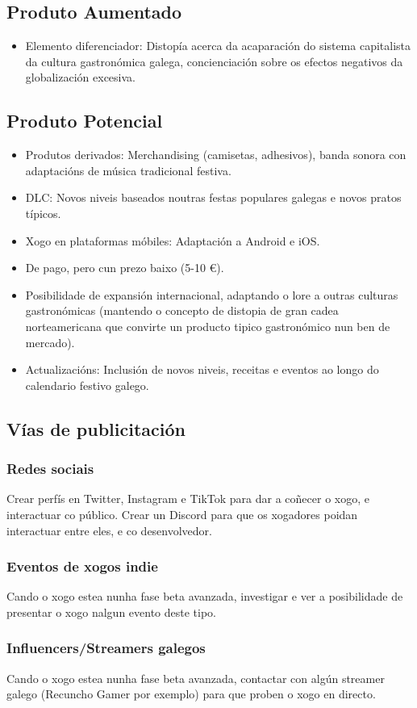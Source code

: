 \documentclass{report}  %
\begin{document}
\subsection{Produto Aumentado}
\begin{itemize}
    \item Elemento diferenciador: Distopía acerca da acaparación do sistema capitalista da cultura gastronómica galega, concienciación sobre os efectos negativos da globalización excesiva.
\end{itemize}

\subsection{Produto Potencial}
\begin{itemize}
    \item Produtos derivados: Merchandising (camisetas, adhesivos), banda sonora con adaptacións de música tradicional festiva.
    \item DLC: Novos niveis baseados noutras festas populares galegas e novos pratos típicos.
    \item Xogo en plataformas móbiles: Adaptación a Android e iOS.
    \item De pago, pero cun prezo baixo (5-10 €).
    \item Posibilidade de expansión internacional, adaptando o lore a outras culturas gastronómicas (mantendo o concepto de distopia de gran cadea norteamericana que convirte un producto tipico gastronómico nun ben de mercado).
    \item Actualizacións: Inclusión de novos niveis, receitas e eventos ao longo do calendario festivo galego.
\end{itemize}


\subsection{Vías de publicitación}
\subsubsection{Redes sociais}
Crear perfís en Twitter, Instagram e TikTok para dar a coñecer o xogo, e interactuar co público. Crear un Discord para que os xogadores poidan interactuar entre eles, e co desenvolvedor.
\subsubsection{Eventos de xogos indie}
Cando o xogo estea nunha fase beta avanzada, investigar e ver a posibilidade de presentar o xogo nalgun evento deste tipo.
\subsubsection{Influencers/Streamers galegos}
Cando o xogo estea nunha fase beta avanzada, contactar con algún streamer galego (Recuncho Gamer por exemplo) para que proben o xogo en directo.
\end{document}
